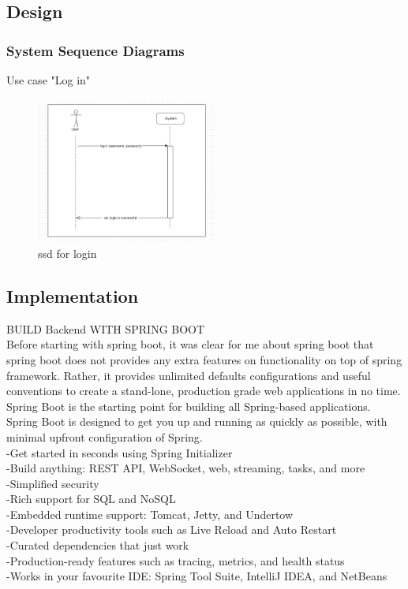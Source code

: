 \documentclass{scrartcl}
\begin{document}
\subsection{Design}
\subsubsection{System Sequence Diagrams}
 Use case "Log in"
\begin{figure}[H]
\centering
\includegraphics[width = 60mm]{ssd-login.JPG}
\caption{ssd for login}
\label{ssd for login}
\end{figure}






\subsection{Implementation}
BUILD Backend WITH SPRING BOOT\\
Before starting with spring boot, it was clear for me about spring boot that spring boot does not provides any extra features on functionality on top of spring framework. Rather, it provides unlimited defaults configurations and useful conventions to create a stand-lone, production grade web applications in no time.\\
Spring Boot is the starting point for building all Spring-based applications. Spring Boot is designed to get you up and running as quickly as possible, with minimal upfront configuration of Spring.\\
 -Get started in seconds using Spring Initializer\\
-Build anything: REST API, WebSocket, web, streaming, tasks, and more\\
-Simplified security\\
-Rich support for SQL and NoSQL\\
-Embedded runtime support: Tomcat, Jetty, and Undertow\\
-Developer productivity tools such as Live Reload and Auto Restart\\
-Curated dependencies that just work\\
-Production-ready features such as tracing, metrics, and health status\\
-Works in your favourite IDE: Spring Tool Suite, IntelliJ IDEA, and NetBeans\\
\end{document}
